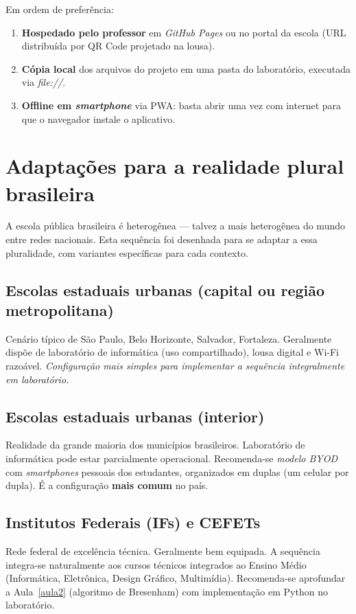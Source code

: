 \documentclass[12pt,a4paper]{scrartcl}
\newcommand{\acc}[1]{\textcolor{accent}{\textbf{#1}}}
\begin{document}
Em ordem de preferência:

\begin{enumerate}[leftmargin=1.5em,itemsep=0.15em,topsep=0.3em]
  \item \textbf{Hospedado pelo professor} em \emph{GitHub Pages} ou no portal da escola (URL distribuída por QR Code projetado na lousa).
  \item \textbf{Cópia local} dos arquivos do projeto em uma pasta do laboratório, executada via \emph{file://}.
  \item \textbf{Offline em \emph{smartphone}} via PWA: basta abrir uma vez com internet para que o navegador instale o aplicativo.
\end{enumerate}

\section{Adaptações para a realidade plural brasileira}\label{sec:adapt}

A escola pública brasileira é heterogênea --- talvez a mais heterogênea do mundo entre redes nacionais. Esta sequência foi desenhada para se adaptar a essa pluralidade, com variantes específicas para cada contexto.

\subsection{Escolas estaduais urbanas (capital ou região metropolitana)}
Cenário típico de São Paulo, Belo Horizonte, Salvador, Fortaleza. Geralmente dispõe de laboratório de informática (uso compartilhado), lousa digital e Wi-Fi razoável. \emph{Configuração mais simples para implementar a sequência integralmente em laboratório.}

\subsection{Escolas estaduais urbanas (interior)}
Realidade da grande maioria dos municípios brasileiros. Laboratório de informática pode estar parcialmente operacional. Recomenda-se \emph{modelo BYOD} com \emph{smartphones} pessoais dos estudantes, organizados em duplas (um celular por dupla). É a configuração \acc{mais comum} no país.

\subsection{Institutos Federais (IFs) e CEFETs}
Rede federal de excelência técnica. Geralmente bem equipada. A sequência integra-se naturalmente aos cursos técnicos integrados ao Ensino Médio (Informática, Eletrônica, Design Gráfico, Multimídia). Recomenda-se aprofundar a Aula~\ref{aula2} (algoritmo de Bresenham) com implementação em Python no laboratório.
\end{document}

